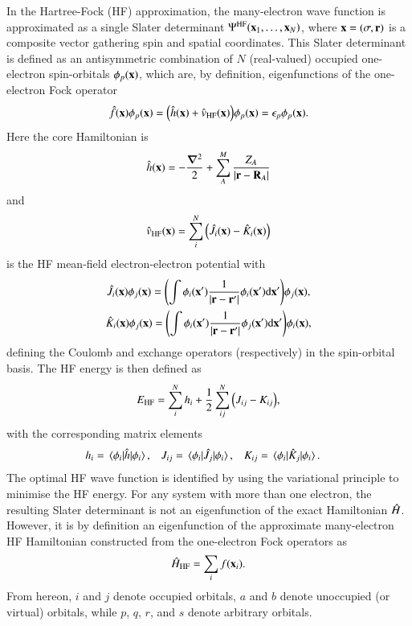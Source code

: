 \documentclass[aps,prb,reprint,noshowkeys,superscriptaddress]{revtex4-1}
\newcommand{\Ne}{N} %
\newcommand{\hH}{\Hat{H}}
\begin{document}
In the Hartree-Fock (HF) approximation, the many-electron wave function is approximated as a single Slater determinant $\Psi^{\text{HF}}(\vb{x}_1,\ldots,\vb{x}_N)$, where $\vb{x} = (\sigma,\vb{r})$ is a composite vector gathering spin and spatial coordinates.
This Slater determinant is defined as an antisymmetric combination of $\Ne$ (real-valued) occupied one-electron spin-orbitals $\phi_p(\vb{x})$, which are, by definition, eigenfunctions of the one-electron Fock operator 
\begin{equation}\label{eq:FockOp}
    \Hat{f}(\vb{x}) \phi_p(\vb{x}) = \qty( \Hat{h}(\vb{x}) + \Hat{v}_\text{HF}(\vb{x}) ) \phi_p(\vb{x}) = \epsilon_p \phi_p(\vb{x}).
\end{equation}
Here the core Hamiltonian is
\begin{equation}
	\Hat{h}(\vb{x}) = -\frac{\grad^2}{2} + \sum_{A}^{M} \frac{Z_A}{\abs{\vb{r}-\vb{R}_A}}
\end{equation}
and
\begin{equation}
    \Hat{v}_\text{HF}(\vb{x}) = \sum_i^{N} \qty( \Hat{J}_i(\vb{x}) - \Hat{K}_i(\vb{x}) )
\end{equation}
is the HF mean-field electron-electron potential with 
\begin{subequations}
\begin{gather}
	\label{eq:CoulOp}
    \Hat{J}_i(\vb{x})\phi_j(\vb{x})=\qty(\int \phi_i(\vb{x}')\frac{1}{\abs{\vb{r} - \vb{r}'}}\phi_i(\vb{x}') \dd\vb{x}' ) \phi_j(\vb{x}),
	\\
	\label{eq:ExcOp}
\Hat{K}_i(\vb{x})\phi_j(\vb{x})=\qty(\int \phi_i(\vb{x}')\frac{1}{\abs{\vb{r} - \vb{r}'}}\phi_j(\vb{x}') \dd\vb{x}')\phi_i(\vb{x}),
\end{gather}
\end{subequations}
defining the Coulomb and exchange operators (respectively) in the spin-orbital basis.\cite{SzaboBook}
The HF energy is then defined as 
\begin{equation}
\label{eq:E_HF}
	E_\text{HF} = \sum_i^{N} h_i + \frac{1}{2} \sum_{ij}^{N} \qty( J_{ij} - K_{ij} ),
\end{equation}
with the corresponding matrix elements
\begin{align}
	h_i & = \mel{\phi_i}{\Hat{h}}{\phi_i},
	&
	J_{ij} & = \mel{\phi_i}{\Hat{J}_j}{\phi_i},
	&
	K_{ij} & = \mel{\phi_i}{\Hat{K}_j}{\phi_i}.
\end{align}
The optimal HF wave function is identified by using the variational principle to minimise the HF energy.
For any system with more than one electron, the resulting Slater determinant is not an eigenfunction of the exact Hamiltonian $\hH$. 
However, it is by definition an eigenfunction of the approximate many-electron HF Hamiltonian constructed 
from the one-electron Fock operators as
\begin{equation}\label{eq:HFHamiltonian}
	\hH_{\text{HF}} = \sum_{i} f(\vb{x}_i).
\end{equation}
From hereon, $i$ and $j$ denote occupied orbitals, $a$ and $b$ denote unoccupied (or virtual) orbitals, while $p$, $q$, $r$, and $s$ denote arbitrary orbitals.
\end{document}
